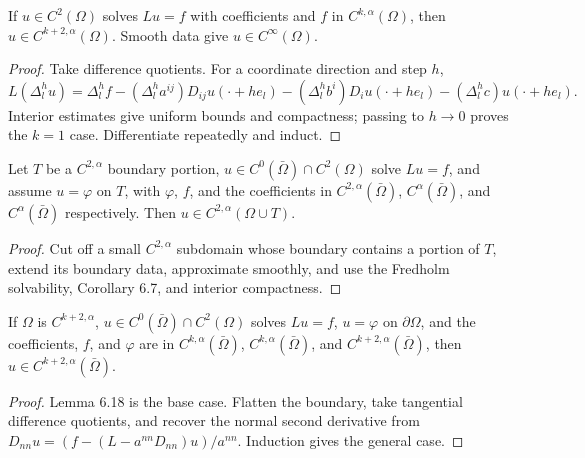 \begin{theorem}
\label{gt-ch06-thm-6-17}
If $u\in C^2(\Omega)$ solves $Lu=f$ with coefficients and $f$ in
$C^{k,\alpha}(\Omega)$, then $u\in C^{k+2,\alpha}(\Omega)$.  Smooth data give
$u\in C^\infty(\Omega)$.
\end{theorem}
\begin{proof}
\sketch Take difference quotients.  For a coordinate direction and step $h$,
\begin{equation}\tag{6.49}
L(\Delta_l^h u)=\Delta_l^h f-(\Delta_l^h a^{ij})D_{ij}u(\cdot+he_l)
-(\Delta_l^h b^i)D_i u(\cdot+he_l)-(\Delta_l^h c)u(\cdot+he_l).
\end{equation}
Interior estimates give uniform bounds and compactness; passing to $h\to0$
proves the $k=1$ case.  Differentiate repeatedly and induct.
\end{proof}

\begin{lemma}
\label{gt-ch06-lem-6-18}
Let $T$ be a $C^{2,\alpha}$ boundary portion, $u\in C^0(\bar\Omega)\cap
C^2(\Omega)$ solve $Lu=f$, and assume $u=\varphi$ on $T$, with $\varphi$,
$f$, and the coefficients in $C^{2,\alpha}(\bar\Omega)$,
$C^\alpha(\bar\Omega)$, and $C^\alpha(\bar\Omega)$ respectively.  Then
$u\in C^{2,\alpha}(\Omega\cup T)$.
\end{lemma}
\begin{proof}
\sketch Cut off a small $C^{2,\alpha}$ subdomain whose boundary contains a
portion of $T$, extend its boundary data, approximate smoothly, and use the
Fredholm solvability, Corollary 6.7, and interior compactness.
\end{proof}

\begin{theorem}
\label{gt-ch06-thm-6-19}
If $\Omega$ is $C^{k+2,\alpha}$, $u\in C^0(\bar\Omega)\cap C^2(\Omega)$ solves
$Lu=f$, $u=\varphi$ on $\partial\Omega$, and the coefficients, $f$, and
$\varphi$ are in $C^{k,\alpha}(\bar\Omega)$, $C^{k,\alpha}(\bar\Omega)$, and
$C^{k+2,\alpha}(\bar\Omega)$, then $u\in C^{k+2,\alpha}(\bar\Omega)$.
\end{theorem}
\begin{proof}
\sketch Lemma 6.18 is the base case.  Flatten the boundary, take tangential
difference quotients, and recover the normal second derivative from
$D_{nn}u=(f-(L-a^{nn}D_{nn})u)/a^{nn}$.  Induction gives the general case.
\end{proof}

